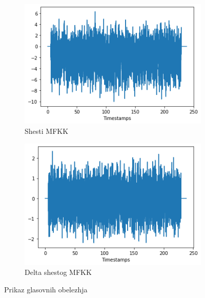 \documentclass[a4paper, openany, oneside, 11pt]{book}
\begin{document}
\begin{figure}[!h]
        \centering
        \begin{subfigure}{0.475\textwidth}
            \centering
            \includegraphics[scale=0.5]{res/cep6.png}
            \caption{Shesti MFKK}
            \label{fig:5a}
            \vspace{0pt}
        \end{subfigure}%
        \begin{subfigure}{0.475\textwidth}
            \centering
            \includegraphics[scale=0.5]{res/Dcep6.png}
            \caption{Delta shestog MFKK}
            \label{fig:5b}
            \vspace{0pt}
        \end{subfigure}
        \caption{Prikaz glasovnih obelezhja}
        \label{fig:5}
\end{figure}
\end{document}
